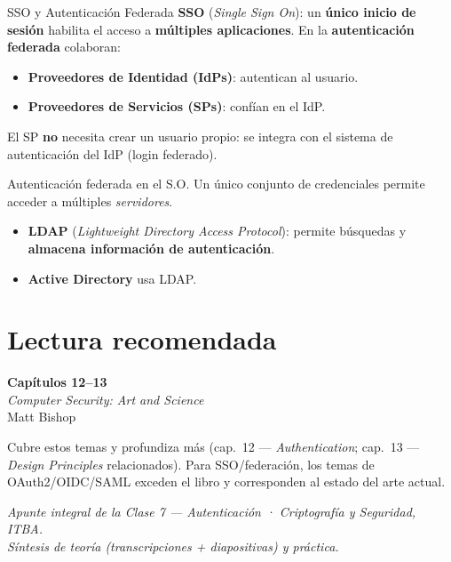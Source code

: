 \documentclass[11pt,a4paper]{article}
\begin{document}
\begin{defbox}{SSO y Autenticación Federada}
\textbf{SSO} (\emph{Single Sign On}): un \textbf{único inicio de sesión} habilita el acceso a
\textbf{múltiples aplicaciones}. En la \textbf{autenticación federada} colaboran:
\begin{itemize}[leftmargin=1.4em,itemsep=1pt]
  \item \textbf{Proveedores de Identidad (IdPs)}: autentican al usuario.
  \item \textbf{Proveedores de Servicios (SPs)}: confían en el IdP.
\end{itemize}
El SP \textbf{no} necesita crear un usuario propio: se integra con el sistema de
autenticación del IdP (login federado).
\end{defbox}

\begin{practbox}{Autenticación federada en el S.O.}
Un único conjunto de credenciales permite acceder a múltiples \emph{servidores}.
\begin{itemize}[leftmargin=1.4em,itemsep=1pt]
  \item \textbf{LDAP} (\emph{Lightweight Directory Access Protocol}): permite búsquedas y
        \textbf{almacena información de autenticación}.
  \item \textbf{Active Directory} usa LDAP.
\end{itemize}
\end{practbox}

\section*{Lectura recomendada}
\begin{center}
\begin{tcolorbox}[enhanced,colback=itbaBlue!20,colframe=itbaCyanDark,boxrule=1pt,
  arc=3pt,width=0.85\textwidth,halign=center]
\large\textbf{Capítulos 12--13}\\[4pt]
\emph{Computer Security: Art and Science}\\[2pt]
Matt Bishop
\end{tcolorbox}
\end{center}
\noindent Cubre estos temas y profundiza más (cap.\ 12 — \emph{Authentication}; cap.\ 13 —
\emph{Design Principles} relacionados). Para SSO/federación, los temas de OAuth2/OIDC/SAML
exceden el libro y corresponden al estado del arte actual.

\vfill
\begin{center}\small\itshape\color{black!60}
Apunte integral de la Clase 7 — Autenticación · Criptografía y Seguridad, ITBA.\\
Síntesis de teoría (transcripciones + diapositivas) y práctica.
\end{center}
\end{document}

